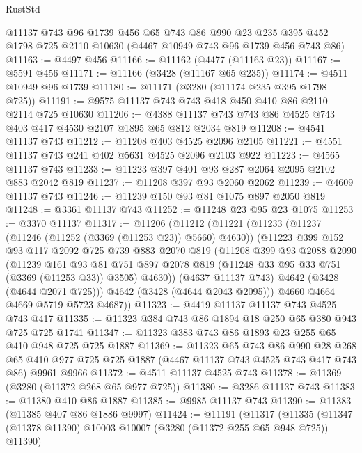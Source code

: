 \begin{lexlean}{RustStd}
\begin{coremodule}
    @11137
    @743
    @96
    @1739
    @456
    @65
    @743
    @86
    @990
    @23
    @235
    @395
    @452
    @1798
    @725
    @2110
    @10630
    (@4467 @10949 @743 @96 @1739 @456 @743 @86)
@11163 := @4497 @456
@11166 := @11162 (@4477 (@11163 @23))
@11167 := @5591 @456
@11171 := @11166 (@3428 (@11167 @65 @235))
@11174 := @4511 @10949 @96 @1739
@11180 := @11171 (@3280 (@11174 @235 @395 @1798 @725))
@11191 := @9575 @11137 @743 @743 @418 @450 @410 @86 @2110 @2114 @725 @10630
@11206 := @4388 @11137 @743 @743 @86 @4525 @743 @403 @417 @4530 @2107 @1895 @65 @812 @2034 @819
@11208 := @4541 @11137 @743
@11212 := @11208 @403 @4525 @2096 @2105
@11221 := @4551 @11137 @743 @241 @402 @5631 @4525 @2096 @2103 @922
@11223 := @4565 @11137 @743
@11233 := @11223 @397 @401 @93 @287 @2064 @2095 @2102 @883 @2042 @819
@11237 := @11208 @397 @93 @2060 @2062
@11239 := @4609 @11137 @743
@11246 := @11239 @150 @93 @81 @1075 @897 @2050 @819
@11248 := @3361 @11137 @743
@11252 := @11248 @23 @95 @23 @1075
@11253 := @3370 @11137
@11317 := @11206
    (@11212
      (@11221
        (@11233
          (@11237 (@11246 (@11252 (@3369 (@11253 @23)) @5660) @4630))
          (@11223
            @399
            @152
            @93
            @117
            @2092
            @725
            @739
            @883
            @2070
            @819
            (@11208
              @399
              @93
              @2088
              @2090
              (@11239
                @161
                @93
                @81
                @751
                @897
                @2078
                @819
                (@11248 @33 @95 @33 @751 (@3369 (@11253 @33)) @3505)
                @4630))
            (@4637 @11137 @743)
            @4642
            (@3428 (@4644 @2071 @725)))
          @4642
          (@3428 (@4644 @2043 @2095)))
        @4660
        @4664
        @4669
        @5719
        @5723
        @4687))
@11323 := @4419 @11137 @11137 @743 @4525 @743 @417
@11335 := @11323 @384 @743 @86 @1894 @18 @250 @65 @380 @943 @725 @725 @1741
@11347 := @11323 @383 @743 @86 @1893 @23 @255 @65 @410 @948 @725 @725 @1887
@11369 := @11323
    @65
    @743
    @86
    @990
    @28
    @268
    @65
    @410
    @977
    @725
    @725
    @1887
    (@4467 @11137 @743 @4525 @743 @417 @743 @86)
    @9961
    @9966
@11372 := @4511 @11137 @4525 @743
@11378 := @11369 (@3280 (@11372 @268 @65 @977 @725))
@11380 := @3286 @11137 @743
@11383 := @11380 @410 @86 @1887
@11385 := @9985 @11137 @743
@11390 := @11383 (@11385 @407 @86 @1886 @9997)
@11424 := @11191
    (@11317
      (@11335
        (@11347 (@11378 @11390) @10003 @10007 (@3280 (@11372 @255 @65 @948 @725)) @11390)

\end{coremodule}
\end{lexlean}
